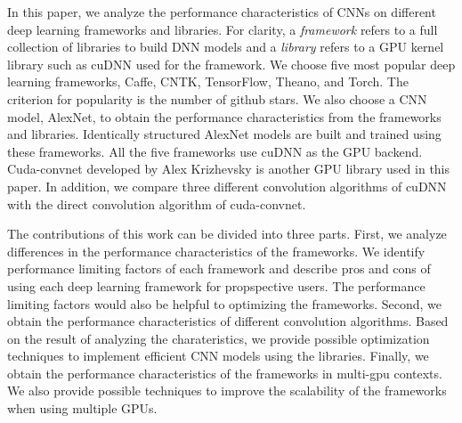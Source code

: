 In this paper, we analyze the performance characteristics of CNNs on different deep learning frameworks and libraries.
For clarity, a \textit{framework} refers to a full collection of libraries to build DNN models and a \textit{library} refers to a GPU kernel library such as cuDNN used for the framework.
We choose five most popular deep learning frameworks, Caffe\cite{jia2014caffe}, CNTK\cite{cntk}, TensorFlow\cite{tensorflow2015-whitepaper}, Theano\cite{DBLP:journals/corr/Al-RfouAAa16}, and Torch\cite{torch}.
The criterion for popularity is the number of github\cite{github} stars.
We also choose a CNN model, AlexNet\cite{krizhevsky2012imagenet}, to obtain the performance characteristics from the frameworks and libraries.
Identically structured AlexNet models are built and trained using these frameworks.
All the five frameworks use cuDNN as the GPU backend.
Cuda-convnet\cite{cuda-convnet} developed by Alex Krizhevsky is another GPU library used in this paper.
In addition, we compare three different convolution algorithms of cuDNN with the direct convolution algorithm of cuda-convnet.

The contributions of this work can be divided into three parts.
First, we analyze differences in the performance characteristics of the frameworks.
We identify performance limiting factors of each framework and describe pros and cons of using each deep learning framework for propspective users.
The performance limiting factors would also be helpful to optimizing the frameworks.
Second, we obtain the performance characteristics of different convolution algorithms.
Based on the result of analyzing the charateristics, we provide possible optimization techniques to implement efficient CNN models using the libraries.
Finally, we obtain the performance characteristics of the frameworks in multi-gpu contexts. We also provide possible techniques to improve the scalability of the frameworks when using multiple GPUs.

